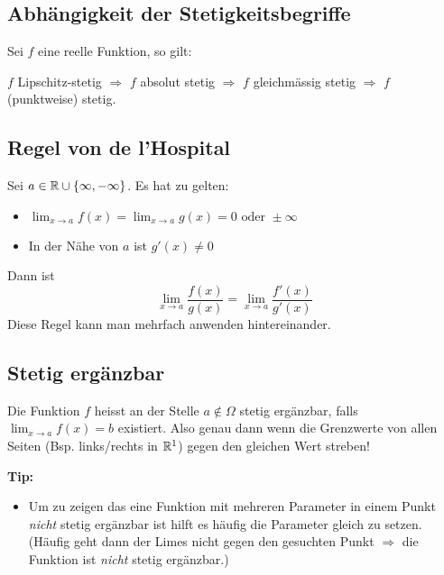 \subsection{Abhängigkeit der Stetigkeitsbegriffe}
Sei $f$ eine reelle Funktion, so gilt:

$f$ Lipschitz-stetig $\Rightarrow$ $f$ absolut stetig $\Rightarrow$ $f$
gleichmässig stetig $\Rightarrow$ $f$ (punktweise) stetig.

\subsection{Regel von de l'Hospital}
Sei $a \in \mathbb{R} \cup \{\infty, -\infty\}$. Es hat zu gelten:
\begin{itemize}
  \item $\lim_{x \to a} f(x) = \lim_{x \to a} g(x) = 0 \text{ oder } \pm\infty$
  \item In der Nähe von $a$ ist $g'(x) \neq 0$
\end{itemize}
Dann ist
\[
\lim_{x \to a} \frac{f(x)}{g(x)} = \lim_{x \to a}
\frac{f'(x)}{g'(x)}
\]
Diese Regel kann man mehrfach anwenden hintereinander.


\subsection{Stetig ergänzbar}
Die Funktion $f$ heisst an der Stelle $a \notin \Omega$ stetig ergänzbar, falls $\lim_{x \to a} f(x) = b$ existiert. Also genau dann wenn die Grenzwerte von allen Seiten (Bsp. links/rechts in $\mathbb{R}^1$) gegen den gleichen Wert streben!

\textbf{Tip:}
\begin{itemize}
  \item Um zu zeigen das eine Funktion mit mehreren Parameter in einem Punkt \emph{nicht} stetig ergänzbar ist
	hilft es häufig die Parameter gleich zu setzen. (Häufig geht dann der Limes nicht gegen den gesuchten Punkt
	 $\Rightarrow$ die Funktion ist \emph{nicht} stetig ergänzbar.)
\end{itemize}
